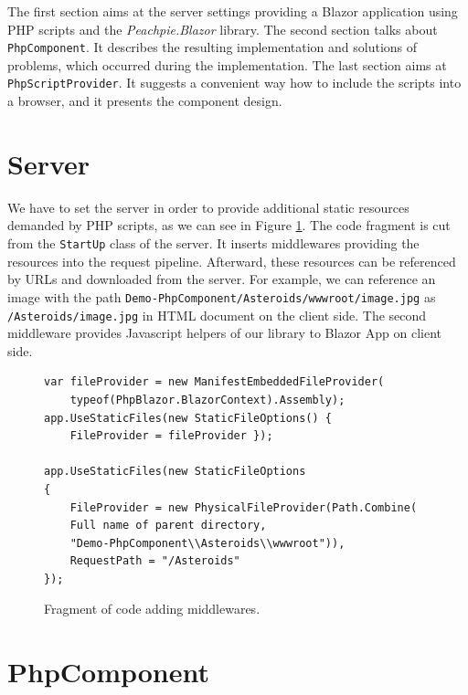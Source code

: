 \par
The first section aims at the server settings providing a Blazor application using PHP scripts and the \textit{Peachpie.Blazor} library.
The second section talks about \texttt{PhpComponent}.
It describes the resulting implementation and solutions of problems, which occurred during the implementation.
The last section aims at \texttt{PhpScriptProvider}.
It suggests a convenient way how to include the scripts into a browser, and it presents the component design.

\section{Server}

We have to set the server in order to provide additional static resources demanded by PHP scripts, as we can see in Figure \ref{img19:settings}.
The code fragment is cut from the \texttt{StartUp} class of the server.
It inserts middlewares providing the resources into the request pipeline.
Afterward, these resources can be referenced by URLs and downloaded from the server.
For example, we can reference an image with the path \texttt{Demo-PhpComponent/Asteroids/wwwroot/image.jpg} as \texttt{/Asteroids/image.jpg} in HTML document on the client side.
The second middleware provides Javascript helpers of our library to Blazor App on client side.
\par
\begin{figure}[H]
\begin{lstlisting}
var fileProvider = new ManifestEmbeddedFileProvider(
	typeof(PhpBlazor.BlazorContext).Assembly);
app.UseStaticFiles(new StaticFileOptions() { 
	FileProvider = fileProvider });

app.UseStaticFiles(new StaticFileOptions
{
	FileProvider = new PhysicalFileProvider(Path.Combine(
	Full name of parent directory, 
	"Demo-PhpComponent\\Asteroids\\wwwroot")),
	RequestPath = "/Asteroids"
});
\end{lstlisting}
\caption{Fragment of code adding middlewares.}
\label{img19:settings}
\end{figure}

\section{PhpComponent}

